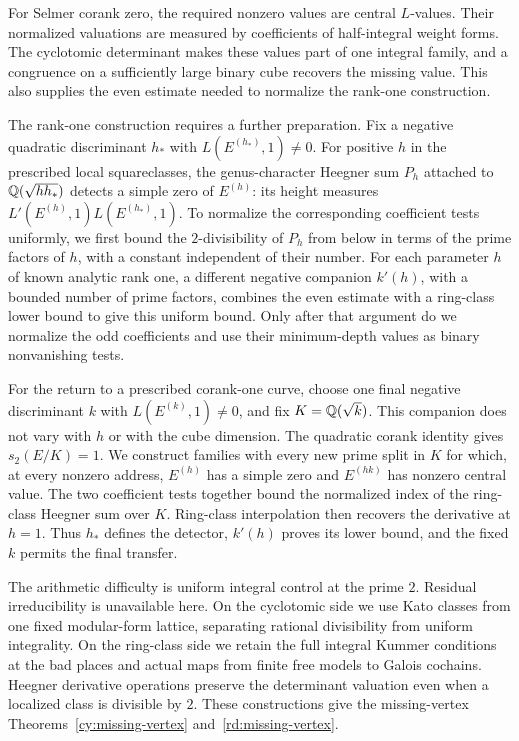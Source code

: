 For Selmer corank zero, the required nonzero values are central
$L$-values.  Their normalized valuations are measured by coefficients
of half-integral weight forms.  The cyclotomic determinant makes these
values part of one integral family, and a congruence on a sufficiently
large binary cube recovers the missing value.  This also supplies the
even estimate needed to normalize the rank-one construction.

The rank-one construction requires a further preparation.  Fix a negative
quadratic discriminant $h_*$ with $L(E^{(h_*)},1)\ne0$.
For positive $h$ in the prescribed local squareclasses, the
genus-character Heegner sum $P_h$ attached to $\mathbb Q(\sqrt{hh_*})$
detects a simple zero of $E^{(h)}$: its height measures
$L'(E^{(h)},1)L(E^{(h_*)},1)$.  To normalize the corresponding coefficient tests
uniformly, we first bound the $2$-divisibility of $P_h$ from below
in terms of the prime factors of $h$, with a constant independent
of their number.
For each parameter $h$ of known analytic rank one, a different negative companion
$k'(h)$, with a bounded number of prime factors, combines the even
estimate with a ring-class lower bound to give this uniform bound.
Only after that argument do we normalize the odd coefficients and use
their minimum-depth values as binary nonvanishing tests.

For the return to a prescribed corank-one curve, choose one final
negative discriminant $k$ with $L(E^{(k)},1)\ne0$, and fix
$K=\mathbb Q(\sqrt{k})$.  This companion does not vary with $h$ or with the
cube dimension.  The quadratic corank identity gives $s_2(E/K)=1$.
We construct families with every new prime split in $K$ for which,
at every nonzero address, $E^{(h)}$ has a simple zero and $E^{(hk)}$
has nonzero central value.  The two coefficient tests together bound
the normalized index of the ring-class Heegner sum over $K$.
Ring-class interpolation then recovers the derivative at $h=1$.
Thus $h_*$ defines the detector, $k'(h)$ proves its lower bound,
and the fixed $k$ permits the final transfer.

The arithmetic difficulty is uniform integral control at the prime $2$.
Residual irreducibility is unavailable here.  On the cyclotomic side we
use Kato classes from one fixed modular-form lattice, separating rational
divisibility from uniform integrality.  On the ring-class side we retain
the full integral Kummer conditions at the bad places and actual maps
from finite free models to Galois cochains.  Heegner derivative operations
preserve the determinant valuation even when a localized class is
divisible by $2$.  These constructions give the missing-vertex
Theorems~\ref{cy:missing-vertex} and~\ref{rd:missing-vertex}.

